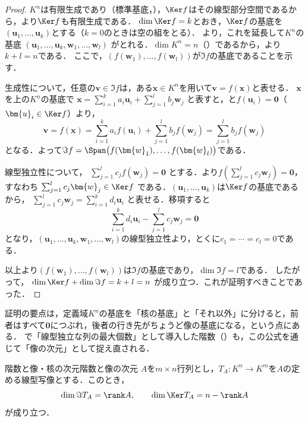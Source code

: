 \begin{tleftbar}
\begin{proof}
  $K^n$は有限生成であり（標準基底，），$\Ker f$はその線型部分空間であるから，より$\Ker f$も有限生成である．
  $\dim \Ker f = k$とおき，$\Ker f$の基底を$(\bm{u}_1, \dots, \bm{u}_k)$とする（$k = 0$のときは空の組をとる）．
  より，これを延長して$K^n$の基底
  $(\bm{u}_1, \dots, \bm{u}_k, \bm{w}_1, \dots, \bm{w}_l)$
  がとれる．$\dim K^n = n$（）であるから，より$k + l = n$である．
  ここで，$(f(\bm{w}_1), \dots, f(\bm{w}_l))$が$\Im f$の基底であることを示す．

  生成性について，任意の$\bm{v} \in \Im f$は，ある$\bm{x} \in K^n$を用いて$\bm{v} = f(\bm{x})$と表せる．
  $\bm{x}$を上の$K^n$の基底で
  $\bm{x} = \sum_{i=1}^{k} a_i \bm{u}_i + \sum_{j=1}^{l} b_j \bm{w}_j$
  と表すと，と$f(\bm{u}_i) = \bm{0}$（$\bm{u}_i \in \Ker f$）より，
  \[
    \bm{v} = f(\bm{x})
    = \sum_{i=1}^{k} a_i f(\bm{u}_i) + \sum_{j=1}^{l} b_j f(\bm{w}_j)
    = \sum_{j=1}^{l} b_j f(\bm{w}_j)
  \]
  となる．よって$\Im f = \Span\bigl(f(\bm{w}_1), \dots, f(\bm{w}_l)\bigr)$である．

  線型独立性について，
  $\sum_{j=1}^{l} c_j f(\bm{w}_j) = \bm{0}$
  とする．より$f\left(\sum_{j=1}^{l} c_j \bm{w}_j\right) = \bm{0}$，すなわち
  $\sum_{j=1}^{l} c_j \bm{w}_j \in \Ker f$
  である．$(\bm{u}_1, \dots, \bm{u}_k)$は$\Ker f$の基底であるから，
  $\sum_{j=1}^{l} c_j \bm{w}_j = \sum_{i=1}^{k} d_i \bm{u}_i$
  と表せる．移項すると
  \[
    \sum_{i=1}^{k} d_i \bm{u}_i - \sum_{j=1}^{l} c_j \bm{w}_j = \bm{0}
  \]
  となり，$(\bm{u}_1, \dots, \bm{u}_k, \bm{w}_1, \dots, \bm{w}_l)$の線型独立性より，とくに$c_1 = \cdots = c_l = 0$である．

  以上より$(f(\bm{w}_1), \dots, f(\bm{w}_l))$は$\Im f$の基底であり，$\dim \Im f = l$である．
  したがって，
  $\dim \Ker f + \dim \Im f = k + l = n$
  が成り立つ．これが証明すべきことであった．
\end{proof}
\end{tleftbar}

証明の要点は，定義域$K^n$の基底を「核の基底」と「それ以外」に分けると，前者はすべて$\bm{0}$につぶれ，後者の行き先がちょうど像の基底になる，という点にある．
で「線型独立な列の最大個数」として導入した階数（）も，この公式を通じて「像の次元」として捉え直される．

\begin{cor}{階数と像・核の次元}{階数と像の次元}
  $A$を$m \times n$行列とし，$T_A \colon K^n \to K^m$を$A$の定める線型写像とする．このとき，
  \[
    \dim \Im T_A = \rank A,
    \qquad
    \dim \Ker T_A = n - \rank A
  \]
  が成り立つ．
\end{cor}

